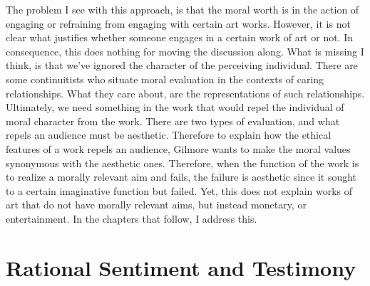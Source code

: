 \documentclass[
  12pt,
]{book}
\theoremstyle{definition}
\theoremstyle{definition}
\theoremstyle{definition}
\theoremstyle{definition}
\theoremstyle{remark}
\begin{document}
The problem I see with this approach, is that the moral worth is in the action of engaging or refraining from engaging with certain art works. However, it is not clear what justifies whether someone engages in a certain work of art or not. In consequence, this does nothing for moving the discussion along. What is missing I think, is that we've ignored the character of the perceiving individual. There are some continuitists who situate moral evaluation in the contexts of caring relationships. What they care about, are the representations of such relationships. Ultimately, we need something in the work that would repel the individual of moral character from the work. There are two types of evaluation, and what repels an audience must be aesthetic. Therefore to explain how the ethical features of a work repels an audience, Gilmore wants to make the moral values synonymous with the aesthetic ones. Therefore, when the function of the work is to realize a morally relevant aim and fails, the failure is aesthetic since it sought to a certain imaginative function but failed. Yet, this does not explain works of art that do not have morally relevant aims, but instead monetary, or entertainment. In the chapters that follow, I address this.

\chapter{Rational Sentiment and Testimony}\label{rational-sentiment-and-testimony}
\end{document}
